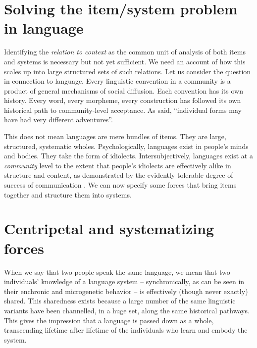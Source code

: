\section{Solving the item/system problem in language}


Identifying the \textit{relation to context} as the common unit of 
analysis of both items and systems is necessary but not yet sufficient. We 
need an account of how this scales up into large structured sets of such 
relations. Let us consider the question in connection to language. Every linguistic convention in a community is a 
product of general mechanisms of social diffusion. Each convention has its own history. Every word, 
every morpheme, every construction has followed its own historical path to 
community-level acceptance. As \citet[444]{bloomfield_language_1933} said, ``individual forms may have had very 
different adventures''. 



This does not mean languages are mere bundles 
of items. They are large, structured, systematic wholes. Psychologically, languages exist in people's minds and bodies.
They take the form of idiolects. Intersubjectively, 
languages exist at a \textit{community} level to the extent that people's 
idiolects are effectively alike in structure and content, as 
demonstrated by the evidently tolerable degree of success 
of communication \citep{enfield_utility_2015}. 
\enlargethispage{1em}
We can now 
specify some forces that bring items together and structure them into 
systems.



\section{Centripetal and systematizing forces}

When we say that two people speak the same language, we mean that two individuals' knowledge of a language system -- synchronically, as can be seen in their enchronic and microgenetic behavior -- is effectively (though never exactly) shared. This sharedness exists because a large number of the same linguistic variants have been channelled, in a huge set, along the same historical pathways. This gives the impression that a language is passed down as a whole, transcending lifetime after lifetime of the individuals who learn and embody the system. 



